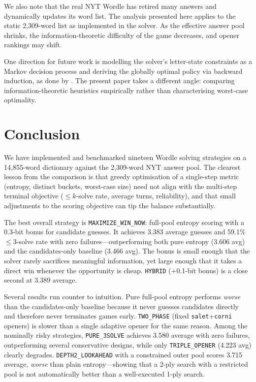 \documentclass{article}
\begin{document}
We also note that the real NYT Wordle has retired many answers and dynamically
updates its word list. The analysis presented here applies to the static 2,309-word
list as implemented in the solver. As the effective answer pool shrinks, the
information-theoretic difficulty of the game decreases, and opener rankings may
shift.

One direction for future work is modelling the solver's letter-state constraints
as a Markov decision process and deriving the globally optimal policy via backward
induction, as done by \citet{bertsimas2025exact}. The present paper takes a different
angle: comparing information-theoretic heuristics empirically rather than
characterising worst-case optimality.

\section{Conclusion}

We have implemented and benchmarked nineteen Wordle solving strategies on a
14,855-word dictionary against the 2,309-word NYT answer pool. The clearest
lesson from the comparison is that greedy optimisation of a single-step metric
(entropy, distinct buckets, worst-case size) need not align with the multi-step
terminal objective ($\leq k$-solve rate, average turns, reliability), and that
small adjustments to the scoring objective can tip the balance substantially.

The best overall strategy is \texttt{MAXIMIZE\_WIN\_NOW}: full-pool entropy
scoring with a 0.3-bit bonus for candidate guesses. It achieves 3.383 average
guesses and 59.1\% $\leq 3$-solve rate with zero failures---outperforming both
pure entropy (3.606 avg) and the candidates-only baseline (3.466 avg). The
bonus is small enough that the solver rarely sacrifices meaningful information,
yet large enough that it takes a direct win whenever the opportunity is cheap.
\texttt{HYBRID} ($+$0.1-bit bonus) is a close second at 3.389 average.

Several results run counter to intuition. Pure full-pool entropy performs
\emph{worse} than the candidates-only baseline because it never guesses
candidates directly and therefore never terminates games early. \texttt{TWO\_PHASE}
(fixed \texttt{salet}+\texttt{corni} openers) is slower than a single adaptive
opener for the same reason. Among the nominally risky strategies, \texttt{PURE\_3SOLVE}
achieves 3.580 average with zero failures, outperforming several conservative
designs, while only \texttt{TRIPLE\_OPENER} (4.223 avg) clearly degrades.
\texttt{DEPTH2\_LOOKAHEAD} with a constrained outer pool scores 3.715 average,
\emph{worse} than plain entropy---showing that a 2-ply search with a restricted
pool is not automatically better than a well-executed 1-ply search.
\end{document}
